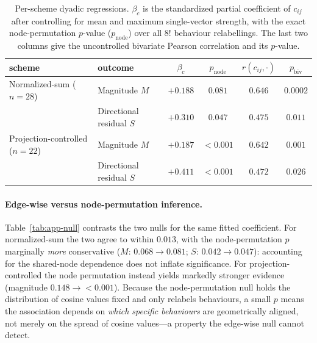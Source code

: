 \begin{table}[h]
  \centering
  \small
  \setlength{\tabcolsep}{5pt}
  \begin{tabular}{llcccc}
    \toprule
    scheme & outcome & $\beta_c$ & $p_{\text{node}}$ & $r(c_{ij},\cdot)$ & $p_{\text{biv}}$ \\
    \midrule
    Normalized-sum ($n=28$) & Magnitude $M$ & $+0.188$ & $0.081$ & $0.646$ & $0.0002$ \\
                            & Directional residual $S$ & $+0.310$ & $0.047$ & $0.475$ & $0.011$ \\
    \midrule
    Projection-controlled ($n=22$) & Magnitude $M$ & $+0.187$ & ${<}0.001$ & $0.642$ & $0.001$ \\
                            & Directional residual $S$ & $+0.411$ & ${<}0.001$ & $0.472$ & $0.026$ \\
    \bottomrule
  \end{tabular}
  \caption{Per-scheme dyadic regressions. $\beta_c$ is the standardized partial coefficient
  of $c_{ij}$ after controlling for mean and maximum single-vector strength, with the exact
  node-permutation $p$-value ($p_{\text{node}}$) over all $8!$ behaviour relabellings. The last
  two columns give the uncontrolled bivariate Pearson correlation and its $p$-value.}
  \label{tab:app-bivar}
\end{table}

\paragraph{Edge-wise versus node-permutation inference.}
Table~\ref{tab:app-null} contrasts the two nulls for the same fitted coefficient. For
normalized-sum the two agree to within $0.013$, with the node-permutation $p$ marginally
\emph{more} conservative ($M$: $0.068\!\to\!0.081$; $S$: $0.042\!\to\!0.047$): accounting for
the shared-node dependence does not inflate significance. For projection-controlled the node
permutation instead yields markedly stronger evidence (magnitude $0.148\!\to\!{<}0.001$).
Because the node-permutation null holds the distribution of cosine values fixed and only
relabels behaviours, a small $p$ means the association depends on \emph{which specific
behaviours} are geometrically aligned, not merely on the spread of cosine values---a property
the edge-wise null cannot detect.

